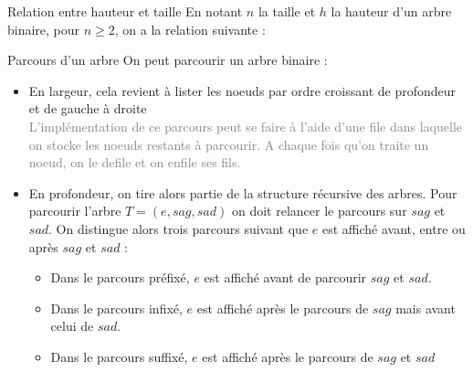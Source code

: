 \documentclass[10pt]{beamer}
\begin{document}
\begin{frame}
	\mframe{\AB}
	\begin{alertblock}{Relation entre hauteur et taille}
		En notant $n$ la taille et $h$ la hauteur d'un arbre binaire, pour $n \geq 2$, on a la relation suivante : \\
		\onslide<2->{$$ \boxed{ h \leq n \leq 2^{h}-1} $$}
	\end{alertblock}
\end{frame}

\begin{frame}
	\mframe{\AB}
	\begin{alertblock}{Parcours d'un arbre}
		On peut parcourir un arbre binaire :
		\begin{itemize}[label=\textbullet]
			\item<2-> En largeur, cela revient à lister les noeuds par ordre 
			croissant de profondeur et de gauche à droite \\
			\onslide<3-> \textcolor{gray}{L'implémentation de ce parcours peut 
			se faire à l'aide d'une file dans laquelle on stocke les noeuds 
			restants à parcourir. A chaque fois qu'on traite un noeud, on le 
			defile et on enfile ses fils.}
			\item<3-> En profondeur, on tire alors partie de la structure 
			récursive des arbres. Pour parcourir l'arbre $T=(e,sag,sad)$ on 
			doit relancer le parcours sur $sag$ et $sad$. On distingue alors 
			trois parcours suivant que $e$ est affiché avant, entre ou après 
			$sag$ et $sad$ :
			\begin{itemize}[label=\textbullet]
				\item<4-> Dans le parcours préfixé, $e$ est affiché avant de 
				parcourir $sag$ et $sad$.
				\item<5-> Dans le parcours infixé, $e$ est affiché après le 
				parcours de $sag$ mais avant celui de  $sad$.
				\item<6-> Dans le parcours suffixé, $e$ est affiché après le 
				parcours de $sag$ et $sad$
			\end{itemize}
		\end{itemize}
	\end{alertblock}
\end{frame}
\end{document}
